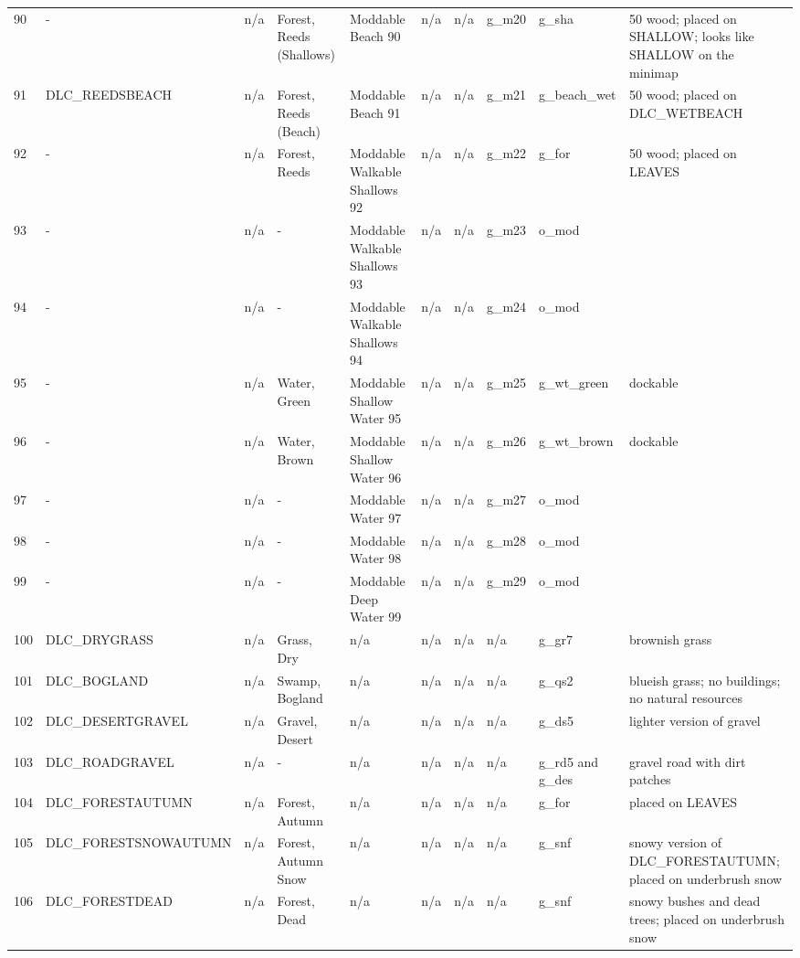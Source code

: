 \begin{appendices}
\begin{landscape}
\begin{longtable}{@{}p{5mm}|p{25mm}p{23mm}|p{14mm}p{14mm}p{14mm}p{14mm}|p{10mm}p{15mm}|p{45mm}@{}}
            90	& -	& n/a	& Forest, Reeds (Shallows)	& Moddable Beach 90	& n/a	& n/a	& g\_m20	& g\_sha		& 50 wood; placed on SHALLOW; looks like SHALLOW on the minimap \\
            91	& DLC\_REEDSBEACH	& n/a	& Forest, Reeds (Beach)	& Moddable Beach 91	& n/a	& n/a	& g\_m21	& g\_beach\_wet		& 50 wood; placed on DLC\_WETBEACH \\
            92	& -	& n/a	& Forest, Reeds	& Moddable Walkable Shallows 92	& n/a	& n/a	& g\_m22	& g\_for		& 50 wood; placed on LEAVES \\
            93	& -	& n/a	& -	& Moddable Walkable Shallows 93	& n/a	& n/a	& g\_m23	& o\_mod		&  \\
            94	& -	& n/a	& -	& Moddable Walkable Shallows 94	& n/a	& n/a	& g\_m24	& o\_mod		&  \\
            95	& -	& n/a	& Water, Green	& Moddable Shallow Water 95	& n/a	& n/a	& g\_m25	& g\_wt\_green		& dockable \\
            96	& -	& n/a	& Water, Brown	& Moddable Shallow Water 96	& n/a	& n/a	& g\_m26	& g\_wt\_brown		& dockable \\
            97	& -	& n/a	& -	& Moddable Water 97	& n/a	& n/a	& g\_m27	& o\_mod		&  \\
            98	& -	& n/a	& -	& Moddable Water 98	& n/a	& n/a	& g\_m28	& o\_mod		&  \\
            99	& -	& n/a	& -	& Moddable Deep Water 99	& n/a	& n/a	& g\_m29	& o\_mod		&  \\
            100	& DLC\_DRYGRASS	& n/a	& Grass, Dry	& n/a	& n/a	& n/a	& n/a	& g\_gr7		& brownish grass \\
            101	& DLC\_BOGLAND	& n/a	& Swamp, Bogland	& n/a	& n/a	& n/a	& n/a	& g\_qs2		& blueish grass; no buildings; no natural resources \\
            102	& DLC\_DESERTGRAVEL	& n/a	& Gravel, Desert	& n/a	& n/a	& n/a	& n/a	& g\_ds5		& lighter version of gravel \\
            103	& DLC\_ROADGRAVEL	& n/a	& -	& n/a	& n/a	& n/a	& n/a	& g\_rd5 and g\_des		& gravel road with dirt patches \\
            104	& DLC\_FORESTAUTUMN	& n/a	& Forest, Autumn	& n/a	& n/a	& n/a	& n/a	& g\_for		& placed on LEAVES \\
            105	& DLC\_FORESTSNOWAUTUMN	& n/a	& Forest, Autumn Snow	& n/a	& n/a	& n/a	& n/a	& g\_snf		& snowy version of DLC\_FORESTAUTUMN; placed on underbrush snow \\
            106	& DLC\_FORESTDEAD	& n/a	& Forest, Dead	& n/a	& n/a	& n/a	& n/a	& g\_snf		& snowy bushes and dead trees; placed on underbrush snow \\

\end{longtable}
\end{landscape}
\end{appendices}

